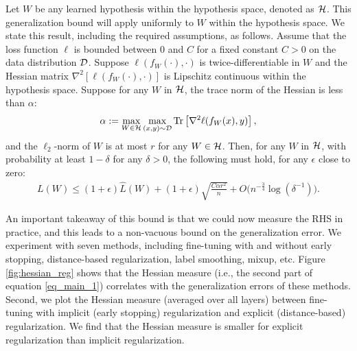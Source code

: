 Let $W$ be any learned hypothesis within the hypothesis space, denoted as $\mathcal{H}$.
This generalization bound will apply uniformly to $W$ within the hypothesis space.
We state this result, including the required assumptions, as follows.
Assume that the loss function $\ell$ is bounded between $0$ and $C$ for a fixed constant $C > 0$ on the data distribution $\mathcal{D}$.
Suppose $\ell(f_W(\cdot), \cdot)$ is twice-differentiable in $W$ and the Hessian matrix $\nabla^2[\ell(f_W(\cdot), \cdot)]$ is Lipschitz continuous within the hypothesis space.
Suppose for any $W$ in $\mathcal{H}$, the trace norm of the Hessian is less than $\alpha$:
\begin{align}
    \alpha := \max_{W\in\mathcal{H}} \max_{(x, y) \sim \mathcal{D}} \operatorname{Tr}\left[\nabla^2 \ell(f_W(x), y)\right], \label{eq_trace_norm}
\end{align}
and the $\ell_2$-norm of $W$ is at most $r$ for any $W \in \mathcal{H}$.
Then, for any $W$ in $\mathcal{H}$, with probability at least $1 - \delta$ for any $\delta > 0$, the following must hold, for any $\epsilon$ close to zero:
\begin{align}
    L(W) \le (1 + \epsilon) \hat L(W) + (1 + \epsilon) \sqrt{\frac {C \alpha r^2}{n}} + O\Big(n^{-\frac 3 4}\log(\delta^{-1})\Big). \label{eq_main_1}
\end{align}

An important takeaway of this bound is that we could now measure the RHS in practice, and this leads to a non-vacuous bound on the generalization error.
We experiment with seven methods, including fine-tuning with and without early stopping, distance-based regularization, label smoothing, mixup, etc.
Figure \ref{fig:hessian_reg} shows that the Hessian measure (i.e., the second part of equation \eqref{eq_main_1}) correlates with the generalization errors of these methods.
Second, we plot the Hessian measure (averaged over all layers) between fine-tuning with implicit (early stopping) regularization and explicit (distance-based) regularization.
We find that the Hessian measure is smaller for explicit regularization than implicit regularization.

